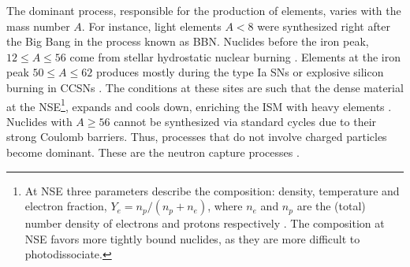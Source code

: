 
The dominant \nuc{} process, responsible for the production of elements, varies with the mass 
number $A$.
%
For instance, light elements $A<8$ were synthesized right after the Big Bang
in the process known as \ac{BBN}.
Nuclides before the iron peak, $12\leq A\leq 56$ come from stellar hydrostatic 
nuclear burning \citep[\eg][]{Rolfs:1988,Hasen:2004}.
Elements at the iron peak $50\leq A \leq 62$ produces mostly 
during the type Ia \acp{SN} or explosive silicon burning in \acp{CCSN} \citep[\eg]{Woosley:2002}. 
The conditions at these sites are such that the dense material at the \ac{NSE}\footnote{
    At \ac{NSE} three parameters describe the composition: 
    density, temperature and electron fraction, $Y_e = n_p/(n_p + n_e)$, 
    where $n_e$ and $n_p$ are the (total) number density of electrons and protons 
    respectively \citep{Seitenzahl:2009}. 
    The composition at \ac{NSE} favors more tightly bound nuclides,
    as they are more difficult to photodissociate.
}, 
expands and cools down, enriching the \ac{ISM} with heavy elements \citep{Iwamoto:2000as}. 
%
Nuclides with $A\geq 56$ cannot be synthesized via standard cycles due to their 
strong Coulomb barriers. 
Thus, processes that do not involve charged particles become dominant. 
These are the neutron capture processes \citep{Burbidge:1957}.



